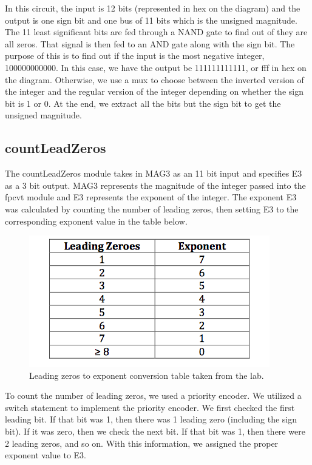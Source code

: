 \documentclass{article}
\begin{document}
In this circuit, the input is 12 bits (represented in hex on the diagram) and the output is one sign bit and one bus of 11 bits which is the unsigned magnitude. The 11 least significant bits are fed through a NAND gate to find out of they are all zeros. That signal is then fed to an AND gate along with the sign bit. The purpose of this is to find out if the input is the most negative integer, 100000000000. In this case, we have the output be 111111111111, or fff in hex on the diagram. Otherwise, we use a mux to choose between the inverted version of the integer and the regular version of the integer depending on whether the sign bit is 1 or 0. At the end, we extract all the bits but the sign bit to get the unsigned magnitude.

\subsection*{countLeadZeros}
The countLeadZeros module takes in MAG3 as an 11 bit input and specifies E3 as a 3 bit output. MAG3 represents the magnitude of the integer passed into the fpcvt module and E3 represents the exponent of the integer. The exponent E3 was calculated by counting the number of leading zeros, then setting E3 to the corresponding exponent value in the table below.

\begin{figure}[H]
	\begin{center}
		\includegraphics[width=.6\textwidth]{exponent_table.png} 
		\caption{Leading zeros to exponent conversion table taken from the lab.}
	\end{center}
\end{figure}

To count the number of leading zeros, we used a priority encoder. We utilized a switch statement to implement the priority encoder. We first checked the first leading bit. If that bit was 1, then there was 1 leading zero (including the sign bit). If it was zero, then we check the next bit. If that bit was 1, then there were 2 leading zeros, and so on. With this information, we assigned the proper exponent value to E3.
\end{document}
